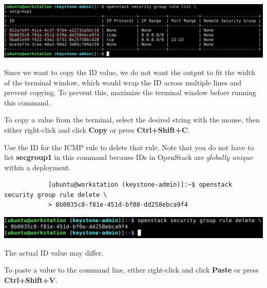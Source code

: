 \documentclass[letterpaper, 12pt]{article}
\begin{document}
\begin{enumerate}
\begin{labstep}
        \begin{center}
            \includegraphics[width=\linewidth]{images/part1/step13.png}
        \end{center}
    \end{labstep}

    \begin{tipbox}
        Since we want to copy the ID value, we do not want the output to fit the width of the terminal window, which would wrap the ID across multiple lines and prevent copying.
        To prevent this, maximize the terminal window before running this command.
    \end{tipbox}
    \begin{tipbox}
        To copy a value from the terminal, select the desired string with the mouse, then either right-click and click \textbf{Copy} or press \textbf{Ctrl+Shift+C}.
    \end{tipbox}

    \begin{labstep}
        Use the ID for the ICMP rule to delete that rule.
        Note that you do not have to list \textbf{secgroup1} in this command because IDs in OpenStack are \textit{globally unique} within a deployment.
        \begin{lstlisting}
            [ubuntu@workstation (keystone-admin)]:~$ openstack security group rule delete \
            > 8b0035c8-f81e-451d-bf08-dd258ebca9f4
        \end{lstlisting}

        \begin{center}
            \includegraphics[width=\linewidth]{images/part1/step14.png}
        \end{center}
    \end{labstep}

    \begin{notebox}
        The actual ID value may differ.
    \end{notebox}
    \begin{tipbox}
        To paste a value to the command line, either right-click and click \textbf{Paste} or press \textbf{Ctrl+Shift+V}.
    \end{tipbox}


\end{enumerate}
\end{document}
